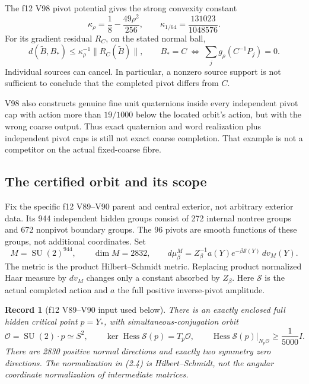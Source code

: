\documentclass[11pt,oneside]{article}
\newtheorem{record}[theorem]{Record}
\DeclareMathOperator{\Hess}{Hess}
\DeclareMathOperator{\SU}{SU}
\newcommand{\cS}{\mathcal S}
\newcommand{\cO}{\mathcal O}
\begin{document}
The f12 V98 pivot potential gives the strong convexity
constant
\[
 \kappa_\rho=\frac18-\frac{49\rho^2}{256},\qquad
 \kappa_{1/64}=\frac{131023}{1048576}.
\]
For its gradient residual \(R_C\), on the stated
normal ball,
\[
 d(\widetilde B,B_*)\le
           \kappa_\rho^{-1}\|R_C(\widetilde B)\|,\qquad
 B_*=C\ \Longleftrightarrow\
                      \sum_j g_\rho(C^{-1}P_j)=0.
 \tag{2.2}
\]
Individual sources can cancel. In particular, a
nonzero source support is not sufficient to conclude
that the completed pivot differs from \(C\).

V98 also constructs genuine fine unit quaternions
inside every independent pivot cap with action more
than \(19/1000\) below the located orbit's action,
but with the wrong coarse output. Thus exact
quaternion and word realization plus independent
pivot caps is still not exact coarse completion.
That example is not a competitor on the actual
fixed-coarse fibre.

\subsection{The certified orbit and its scope}

Fix the specific f12 V89--V90 parent and central
exterior, not arbitrary exterior data. Its 944
independent hidden groups consist of 272 internal
nontree groups and 672 nonpivot boundary groups.
The 96 pivots are smooth functions of these groups,
not additional coordinates. Set
\[
 M=\SU(2)^{944},\qquad \dim M=2832,
 \qquad d\mu_\beta^M=Z_\beta^{-1}a(Y)
                              e^{-\beta\cS(Y)}\,dv_M(Y).
 \tag{2.3}
\]
The metric is the product Hilbert--Schmidt metric.
Replacing product normalized Haar measure by
\(dv_M\) changes only a constant absorbed by \(Z_\beta\).
Here \(\cS\) is the actual completed action and \(a\)
the full positive inverse-pivot amplitude.

\begin{record}[f12 V89--V90 input used below]
\label{rec:orbit}
There is an exactly enclosed full hidden critical
point \(p=Y_*\), with simultaneous-conjugation orbit
\[
 \cO=\SU(2)\cdot p\simeq S^2,\qquad
 \ker\Hess\cS(p)=T_p\cO,\qquad
 \Hess\cS(p)|_{N_p\cO}\ge\frac1{5000}I.
 \tag{2.4}
\]
There are 2830 positive normal directions and exactly
two symmetry zero directions. The normalization in
(2.4) is Hilbert--Schmidt, not the angular coordinate
normalization of intermediate matrices.
\end{record}
\end{document}
